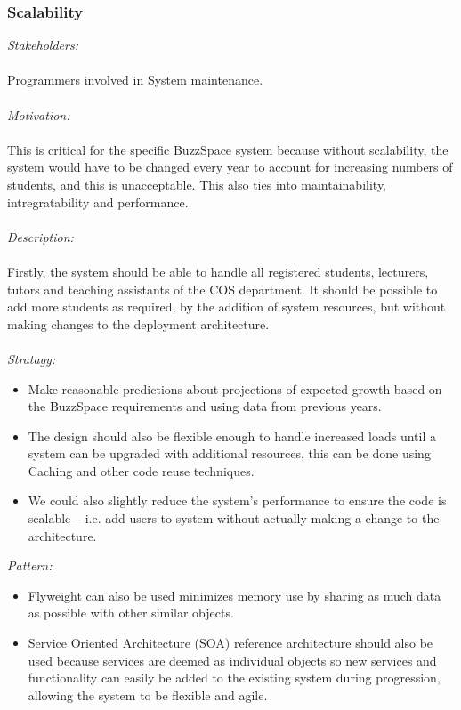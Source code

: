 \documentclass[a4paper,12pt]{report}
\begin{document}
		\subsubsection{Scalability}
		\emph{Stakeholders: }\\
			\\Programmers involved in System maintenance.\\\\
		\emph{Motivation: }\\\\ This is critical for the specific BuzzSpace system because without scalability, the system would have to be changed every year to account for increasing numbers of students, and this is unacceptable. This also ties into maintainability, intregratability and performance. \\\\
		\emph{Description: }\\\\ Firstly, the system should be able to handle all registered students, lecturers, tutors and teaching assistants of the COS department. It should be possible to add more students as required, by the addition of system resources, but without making changes to the deployment architecture.\\\\
		\emph{Stratagy: }\\
		\begin{itemize}
			\item Make reasonable predictions about projections of expected growth based on the BuzzSpace requirements and using data from previous years.\
	                      \item The design should also be flexible enough to handle increased loads until a system can be upgraded with additional resources, this can be done using Caching and other code reuse techniques. 
			 \item We could also slightly reduce the system’s performance to ensure the code is scalable – i.e. add users to system without actually making a change to the architecture.
		\end{itemize}
		\emph{Pattern: }\\
		\begin{itemize}
			\item Flyweight can also be used minimizes memory use by sharing as much data as possible with other similar objects.
			\item Service Oriented Architecture (SOA) reference architecture should also be used because services are deemed as individual objects so new services and functionality can easily be added to the existing system during progression, allowing the system to be flexible and agile.
		\end{itemize}
			
\end{document}
